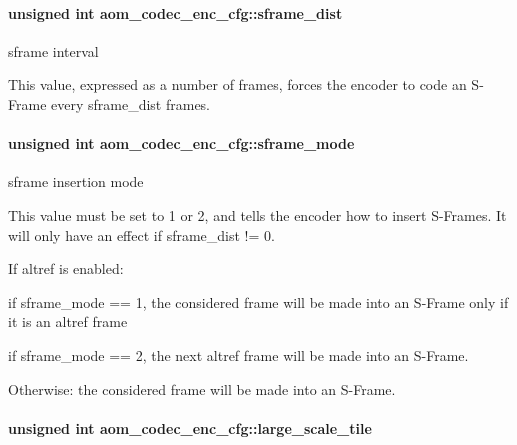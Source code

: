 \paragraph[{\texorpdfstring{sframe\+\_\+dist}{sframe_dist}}]{\setlength{\rightskip}{0pt plus 5cm}unsigned int aom\+\_\+codec\+\_\+enc\+\_\+cfg\+::sframe\+\_\+dist}\hypertarget{structaom__codec__enc__cfg_aa72f5e8f1508388778175d8075e15195}{}\label{structaom__codec__enc__cfg_aa72f5e8f1508388778175d8075e15195}


sframe interval 

This value, expressed as a number of frames, forces the encoder to code an S-\/\+Frame every sframe\+\_\+dist frames. 
\paragraph[{\texorpdfstring{sframe\+\_\+mode}{sframe_mode}}]{\setlength{\rightskip}{0pt plus 5cm}unsigned int aom\+\_\+codec\+\_\+enc\+\_\+cfg\+::sframe\+\_\+mode}\hypertarget{structaom__codec__enc__cfg_aab919adaf0e01b41da93505a075b6804}{}\label{structaom__codec__enc__cfg_aab919adaf0e01b41da93505a075b6804}


sframe insertion mode 

This value must be set to 1 or 2, and tells the encoder how to insert S-\/\+Frames. It will only have an effect if sframe\+\_\+dist != 0.

If altref is enabled\+:
\begin{DoxyItemize}
\item if sframe\+\_\+mode == 1, the considered frame will be made into an S-\/\+Frame only if it is an altref frame
\item if sframe\+\_\+mode == 2, the next altref frame will be made into an S-\/\+Frame.
\end{DoxyItemize}

Otherwise\+: the considered frame will be made into an S-\/\+Frame. 
\paragraph[{\texorpdfstring{large\+\_\+scale\+\_\+tile}{large_scale_tile}}]{\setlength{\rightskip}{0pt plus 5cm}unsigned int aom\+\_\+codec\+\_\+enc\+\_\+cfg\+::large\+\_\+scale\+\_\+tile}\hypertarget{structaom__codec__enc__cfg_af4583da6c145778f822a4a61db28c40a}{}\label{structaom__codec__enc__cfg_af4583da6c145778f822a4a61db28c40a}


